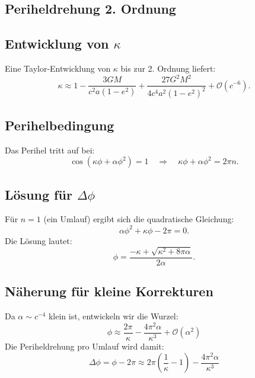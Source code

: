 \subsection{Periheldrehung 2. Ordnung}
\subsection*{Entwicklung von $\kappa$}
Eine Taylor-Entwicklung von $\kappa$ bis zur 2. Ordnung liefert:
\[
    \kappa \approx 1 - \frac{3GM}{c^2 a(1 - e^2)} + \frac{27G^2 M^2}{4c^4 a^2 (1 - e^2)^2} + \mathcal{O}(c^{-6}).
\]

\subsection*{Perihelbedingung}
Das Perihel tritt auf bei:
\[
    \cos\left(\kappa\phi + \alpha\phi^2\right) = 1 \quad \Rightarrow \quad \kappa\phi + \alpha\phi^2 = 2\pi n.
\]

\subsection*{Lösung für $\Delta\phi$}
Für $n=1$ (ein Umlauf) ergibt sich die quadratische Gleichung:
\[
\alpha\phi^2 + \kappa\phi - 2\pi = 0.
\]
Die Lösung lautet:
\begin{equation}
\phi = \frac{-\kappa + \sqrt{\kappa^2 + 8\pi\alpha}}{2\alpha}.
\end{equation}

\subsection*{Näherung für kleine Korrekturen}
Da $\alpha \sim c^{-4}$ klein ist, entwickeln wir die Wurzel:
\[
    \phi \approx \frac{2\pi}{\kappa} - \frac{4\pi^2\alpha}{\kappa^3} + \mathcal{O}(\alpha^2)
\]
Die Periheldrehung pro Umlauf wird damit:
\begin{equation}
    \boxed
    {
        \Delta\phi = \phi - 2\pi \approx 2\pi\left(\frac{1}{\kappa} - 1\right) - \frac{4\pi^2\alpha}{\kappa^3}
    }
\end{equation}
